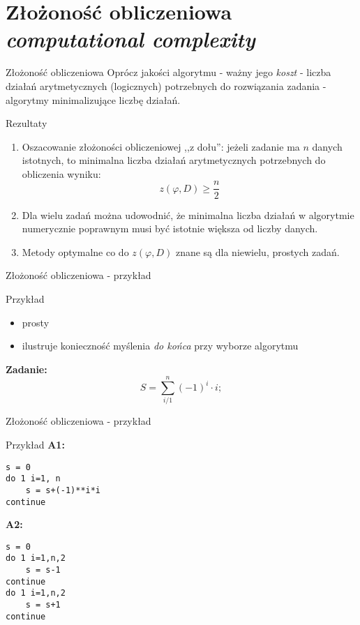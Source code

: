 \section{Złożoność obliczeniowa {\it computational complexity}}
\begin{frame}{Złożoność obliczeniowa}
	Oprócz jakości algorytmu - ważny jego {\it koszt} - liczba działań arytmetycznych (logicznych) potrzebnych do rozwiązania zadania - algorytmy minimalizujące liczbę działań.
\end{frame}
\begin{frame}{Rezultaty}
	\begin{enumerate}
		\item Oszacowanie złożoności obliczeniowej ,,z dołu'': jeżeli zadanie ma $n$ danych istotnych, to minimalna liczba działań arytmetycznych potrzebnych do obliczenia wyniku:
        \[
        	z(\varphi, D) \ge \frac{n}{2}
        \]
        \item Dla wielu zadań można udowodnić, że minimalna liczba działań w algorytmie numerycznie poprawnym musi być istotnie większa od liczby danych.
        \item Metody optymalne co do $z(\varphi, D)$ znane są dla niewielu, prostych zadań.
	\end{enumerate}
\end{frame}
\begin{frame}{Złożoność obliczeniowa - przykład}
	\begin{exampleblock}{Przykład}
        \begin{itemize}
            \item prosty
            \item ilustruje konieczność myślenia {\it do końca} przy wyborze algorytmu
        \end{itemize}
        {\bf Zadanie:}
        \[
        	S = \sum_{i/1}^n (-1)^i \cdot i;
        \]
	\end{exampleblock}
\end{frame}
\begin{frame}[fragile]{Złożoność obliczeniowa - przykład}
	\begin{exampleblock}{Przykład}
    	{\bf A1:}
    	\begin{lstlisting}[escapechar=|]
s = 0
do 1 i=1, n
    s = s+(-1)**i*i
continue \end{lstlisting}
		\vspace{-15pt}
    	{\bf A2:}
    	\begin{lstlisting}[escapechar=|]
s = 0
do 1 i=1,n,2
    s = s-1
continue
do 1 i=1,n,2
	s = s+1
continue \end{lstlisting}
		\vspace{-15pt}
	\end{exampleblock}
\end{frame}
